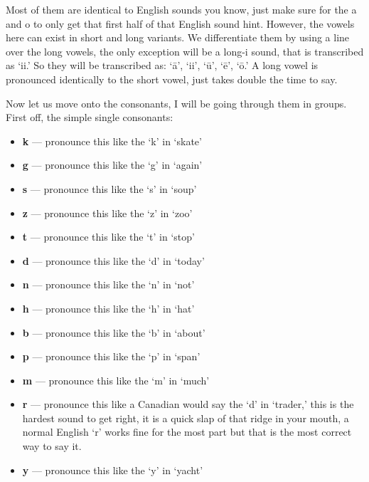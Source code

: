 Most of them are identical to English sounds you know, just make sure for the a and o to only get that first half of that English sound hint. However, the vowels here can exist in short and long variants. We differentiate them by using a line over the long vowels, the only exception will be a long-i sound, that is transcribed as `ii.' So they will be transcribed as: `\=a', `ii', `\=u', `\=e', `\=o.' A long vowel is pronounced identically to the short vowel, just takes double the time to say.

Now let us move onto the consonants, I will be going through them in groups. First off, the simple single consonants:

\begin{itemize}

	\item \textbf{k} --- pronounce this like the `k' in `skate'

	\item \textbf{g} --- pronounce this like the `g' in `again'

	\item \textbf{s} --- pronounce this like the `s' in `soup'

	\item \textbf{z} --- pronounce this like the `z' in `zoo'

	\item \textbf{t} --- pronounce this like the `t' in `stop'

	\item \textbf{d} --- pronounce this like the `d' in `today'

	\item \textbf{n} --- pronounce this like the `n' in `not'

	\item \textbf{h} --- pronounce this like the `h' in `hat'

	\item \textbf{b} --- pronounce this like the `b' in `about'

	\item \textbf{p} --- pronounce this like the `p' in `span'

	\item \textbf{m} --- pronounce this like the `m' in `much'

	\item \textbf{r} --- pronounce this like a Canadian would say the `d' in `trader,' this is the hardest sound to get right, it is a quick slap of that ridge in your mouth, a normal English `r' works fine for the most part but that is the most correct way to say it.

	\item \textbf{y} --- pronounce this like the `y' in `yacht'

\end{itemize}


